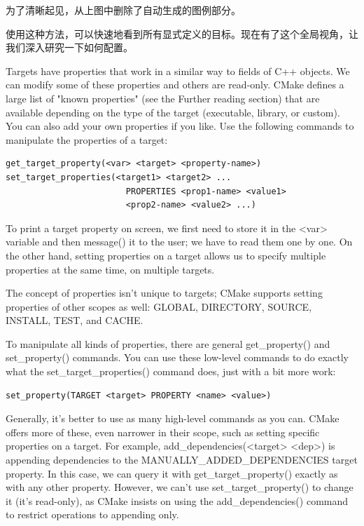 为了清晰起见，从上图中删除了自动生成的图例部分。

使用这种方法，可以快速地看到所有显式定义的目标。现在有了这个全局视角，让我们深入研究一下如何配置。
 

Targets have properties that work in a similar way to fields of C++ objects. We can modify some of these properties and others are read-only. CMake defines a large list of "known properties" (see the Further reading section) that are available depending on the type of the target (executable, library, or custom). You can also add your own properties if you like. Use the following commands to manipulate the properties of a target:

\begin{lstlisting}[style=styleCMake]
get_target_property(<var> <target> <property-name>)
set_target_properties(<target1> <target2> ...
						PROPERTIES <prop1-name> <value1>
						<prop2-name> <value2> ...)
\end{lstlisting}

To print a target property on screen, we first need to store it in the <var> variable and then message() it to the user; we have to read them one by one. On the other hand, setting properties on a target allows us to specify multiple properties at the same time, on multiple targets.

The concept of properties isn't unique to targets; CMake supports setting properties of other scopes as well: GLOBAL, DIRECTORY, SOURCE, INSTALL, TEST, and CACHE.

To manipulate all kinds of properties, there are general get\_property() and set\_property() commands. You can use these low-level commands to do exactly what the set\_target\_properties() command does, just with a bit more work:

\begin{lstlisting}[style=styleCMake]
set_property(TARGET <target> PROPERTY <name> <value>)
\end{lstlisting}

Generally, it's better to use as many high-level commands as you can. CMake offers more of these, even narrower in their scope, such as setting specific properties on a target. For example, add\_dependencies(<target> <dep>) is appending dependencies to the MANUALLY\_ADDED\_DEPENDENCIES target property. In this case, we can query it with get\_target\_property() exactly as with any other property. However, we can't use set\_target\_property() to change it (it's read-only), as CMake insists on using the add\_dependencies() command to restrict operations to appending only.

